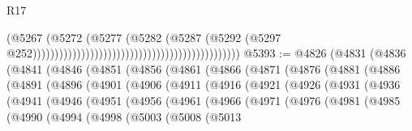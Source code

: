 \begin{lexlean}{R17}
\begin{coremodule}
                                                                                    (@5267
                                                                                      (@5272
                                                                                        (@5277
                                                                                          (@5282
                                                                                            (@5287
                                                                                              (@5292
                                                                                                (@5297
                                                                                                  @252)))))))))))))))))))))))))))))))))))))))))))))))
@5393 := @4826
    (@4831
      (@4836
        (@4841
          (@4846
            (@4851
              (@4856
                (@4861
                  (@4866
                    (@4871
                      (@4876
                        (@4881
                          (@4886
                            (@4891
                              (@4896
                                (@4901
                                  (@4906
                                    (@4911
                                      (@4916
                                        (@4921
                                          (@4926
                                            (@4931
                                              (@4936
                                                (@4941
                                                  (@4946
                                                    (@4951
                                                      (@4956
                                                        (@4961
                                                          (@4966
                                                            (@4971
                                                              (@4976
                                                                (@4981
                                                                  (@4985
                                                                    (@4990
                                                                      (@4994
                                                                        (@4998
                                                                          (@5003
                                                                            (@5008
                                                                              (@5013

\end{coremodule}
\end{lexlean}
